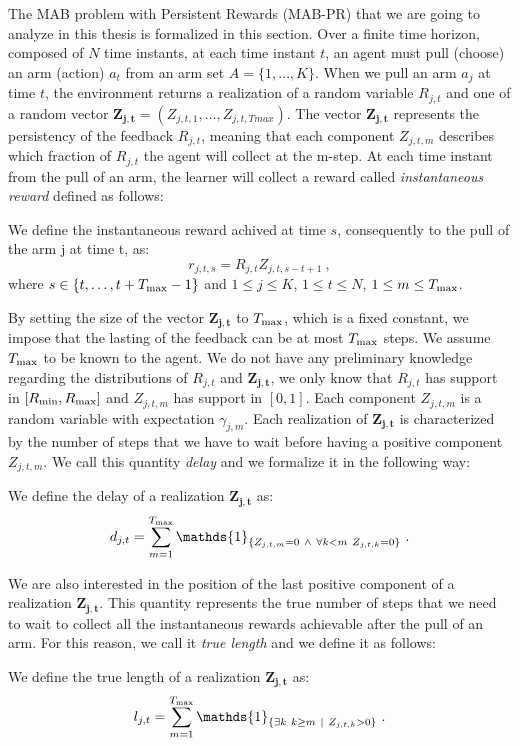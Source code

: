 The MAB problem with Persistent Rewards (MAB-PR) that we are going to analyze in this thesis is formalized in this section. Over a finite time horizon, composed of $N$ time instants, at each time instant $t$, an agent must pull (choose) an arm (action) $a_t$ from an arm set $A =\{1, \dots, K\} $. When we pull an arm $a_j$ at time $t$, the environment returns a realization of a random variable $R_{j,t}$ and one of a random vector $\boldsymbol{Z_{j,t}}= (Z_{j,t,1},\dots, Z_{j,t,Tmax})$. The vector $\boldsymbol{Z_{j,t}}$ represents the persistency of the feedback $R_{j,t}$, meaning that each component $Z_{j,t,m}$ describes which fraction of $R_{j,t}$ the agent will collect at the m-step. At each time instant from the pull of an arm, the learner will collect a reward called \emph{instantaneous reward} defined as follows:
\begin{definition}
	We define the instantaneous reward achived at time $s$, consequently to the pull of the arm j at time t, as:	
		$$r_{j,t,s} = R_{j,t} Z_{j,t,s-t+1} \ ,$$
where $s \in \{t,\dots,t+T_{\textnormal{max}}-1\}$ and $1\leq j \leq K$, $1\leq t \leq N$, $1\leq m \leq T_{\textnormal{max}}$.
\end{definition}
By setting the size of the vector $\boldsymbol{Z_{j,t}}$ to $T_{\textnormal{max}}$, which is a fixed constant, we impose that the lasting of the feedback can be at most $T_{\textnormal{max}}$ steps. We assume $T_{\textnormal{max}}$ to be known to the agent. We do not have any preliminary knowledge regarding the distributions of $R_{j,t}$ and $\boldsymbol{Z_{j,t}}$, we only know that $R_{j,t}$ has support in $[R_{\textnormal{min}},R_{\textnormal{max}}]$ and $Z_{j,t,m}$ has support in $[0,1]$. Each component $Z_{j,t,m}$ is a random variable with expectation $\gamma_{j,m}$. Each realization of $\boldsymbol{Z_{j,t}}$ is characterized by the number of steps that we have to wait before having a positive component $Z_{j,t,m}$. We call this quantity \emph{delay} and we formalize it in the following way:
\begin{definition}[Delay]
	We define the delay of a realization $\boldsymbol{Z_{j,t}}$ as:$$d_{j,t} = \sum_{m=1}^{\Tmax}\mathds{1}_{\{Z_{j,t,m}=0\ \wedge\ \forall k<m\ Z_{j,t,k} = 0\}}\ .$$

\end{definition}
We are also interested in the position of the last positive component of a realization $\boldsymbol{Z_{j,t}}$. This quantity represents the true number of steps that we need to wait to collect all the instantaneous rewards achievable after the pull of an arm. For this reason, we call it \emph{true length} and we define it as follows:
\begin{definition}
	We define the true length of a realization $\boldsymbol{Z_{j,t}}$ as:
		$$l_{j,t} = \sum_{m=1}^{\Tmax}\mathds{1}_{\{\exists k \ k\geq m \ \mid \ Z_{j,t,k} > 0\}} \ .$$
\end{definition}




